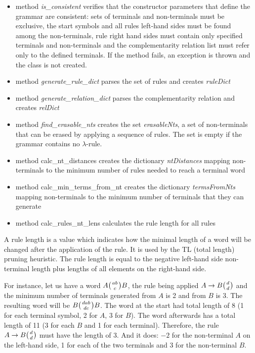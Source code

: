 \begin{itemize}
  \item{method \textit{is\_consistent} verifies that the constructor parameters that define the grammar are consistent: sets of terminals and non-terminals must be exclusive, the start symbols and all rules left-hand sides must be found among the non-terminals, rule right hand sides must contain only specified terminals and non-terminals and the complementarity relation list must refer only to the defined terminals. If the method fails, an exception is thrown and the class is not created.}

  \item{method \textit{generate\_rule\_dict} parses the set of rules and creates \textit{ruleDict}}

  \item{method \textit{generate\_relation\_dict} parses the complementarity relation and creates \textit{relDict}}

  \item{method \textit{find\_erasable\_nts} creates the set \textit{erasableNts}, a set of non-terminals that can be erased by applying a sequence of rules. The set is empty if the grammar contains no $\lambda$-rule.}

  \item{method calc\_nt\_distances creates the dictionary \textit{ntDistances} mapping non-terminals to the minimum number of rules needed to reach a terminal word}

  \item{method calc\_min\_terms\_from\_nt creates the dictionary \textit{termsFromNts} mapping non-terminals to the minimum number of terminals that they can generate}

  \item{method calc\_rules\_nt\_lens calculates the rule length for all rules}
\end{itemize}

A rule length is a value which indicates how the minimal length of a word will be changed after the application of the rule. It is used by the TL (total length) pruning heuristic. The rule length is equal to the negative left-hand side non-terminal length plus lengths of all elements on the right-hand side.

For instance, let us have a word $A \wkpair{ab}{c} B$, the rule being applied $A \rightarrow B \wkpair{d}{d}$ and the minimum number of terminals generated from $A$ is 2 and from $B$ is 3. The resulting word will be $B \wkpair{dab}{dc} B$. The word at the start had total length of 8 (1 for each terminal symbol, 2 for $A$, 3 for $B$). The word afterwards has a total length of 11 (3 for each $B$ and 1 for each terminal). Therefore, the rule $A \rightarrow B \wkpair{d}{d}$ must have the length of 3. And it does: $-2$ for the non-terminal $A$ on the left-hand side, 1 for each of the two terminals and 3 for the non-terminal $B$.

